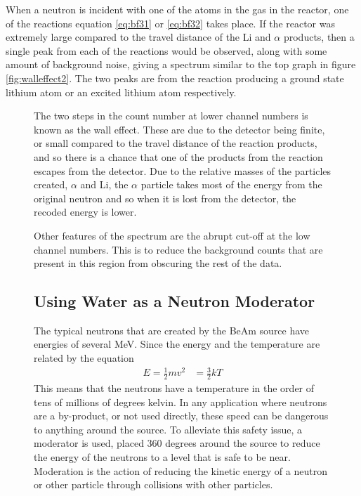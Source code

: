 When a neutron is incident with one of the atoms in the gas in the reactor, one of the reactions equation \ref{eq:bf31} or \ref{eq:bf32} takes place. If the reactor was extremely large compared to the travel distance of the Li and $\alpha$ products, then a single peak from each of the reactions would be observed, along with some amount of background noise, giving a spectrum similar to the top graph in figure \ref{fig:walleffect2}. The two peaks are from the reaction producing a ground state lithium atom or an excited lithium atom respectively. 
\begin{figure}[ht]
The two steps in the count number at lower channel numbers is known as the wall effect. These are due to the detector being finite, or small compared to the travel distance of the reaction products, and so there is a chance that one of the products from the reaction escapes from the detector. Due to the relative masses of the particles created, $\alpha$ and Li, the $\alpha$ particle takes most of the energy from the original neutron and so when it is lost from the detector, the recoded energy is lower.

Other features of the spectrum are the abrupt cut-off at the low channel numbers. This is to reduce the background counts that are present in this region from obscuring the rest of the data. 

\subsection{Using Water as a Neutron Moderator} %
\label{sub:using_water_as_a_neutron_moderator}
The typical neutrons that are created by the BeAm source have energies of several MeV. Since the energy and the temperature are related by the equation
\begin{align}
  E = \frac{1}{2}mv^2 &= \frac{3}{2}kT
\end{align}
This means that the neutrons have a temperature in the order of tens of millions of degrees kelvin. In any application where neutrons are a by-product, or not used directly, these speed can be dangerous to anything around the source. To alleviate this safety issue, a moderator is used, placed 360 degrees around the source to reduce the energy of the neutrons to a level that is safe to be near. Moderation is the action of reducing the kinetic energy of a neutron or other particle through collisions with other particles. 


\end{figure}
